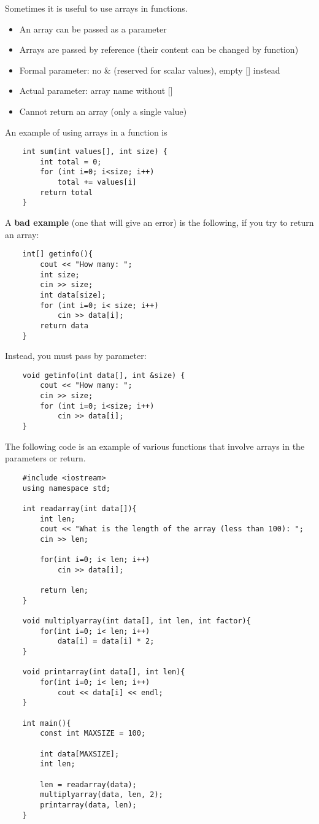 \documentclass[]{article}
\begin{document}
Sometimes it is useful to use arrays in functions.

\begin{itemize}
	\item An array can be passed as a parameter
	\item Arrays are passed by reference (their content can be changed by function)
	\item Formal parameter: no \& (reserved for scalar values), empty [] instead
	\item Actual parameter: array name without []
	\item Cannot return an array (only a single value)
\end{itemize}\bigbreak

An example of using arrays in a function is

\begin{lstlisting}
	int sum(int values[], int size) {
		int total = 0;
		for (int i=0; i<size; i++)
			total += values[i]
		return total
	}
\end{lstlisting}\bigbreak

A \textbf{bad example} (one that will give an error) is the following, if you try to return an array:

\begin{lstlisting}
	int[] getinfo(){
		cout << "How many: ";
		int size;
		cin >> size;
		int data[size];
		for (int i=0; i< size; i++)
			cin >> data[i];
		return data
	}
\end{lstlisting}\bigbreak

Instead, you must pass by parameter:

\begin{lstlisting} 
	void getinfo(int data[], int &size) {
		cout << "How many: ";
		cin >> size;
		for (int i=0; i<size; i++)
			cin >> data[i];
	}
\end{lstlisting}\bigbreak

The following code is an example of various functions that involve arrays in the parameters or return.

\begin{lstlisting}
	#include <iostream>
	using namespace std;
	
	int readarray(int data[]){
		int len;
		cout << "What is the length of the array (less than 100): ";
		cin >> len;
		
		for(int i=0; i< len; i++)
			cin >> data[i];
		
		return len;
	}
	
	void multiplyarray(int data[], int len, int factor){
		for(int i=0; i< len; i++)
			data[i] = data[i] * 2;
	}
	
	void printarray(int data[], int len){
		for(int i=0; i< len; i++)
			cout << data[i] << endl;
	}
	
	int main(){
		const int MAXSIZE = 100;
		
		int data[MAXSIZE];
		int len;
		
		len = readarray(data);
		multiplyarray(data, len, 2);
		printarray(data, len);
	}
\end{lstlisting}\bigbreak
\end{document}
